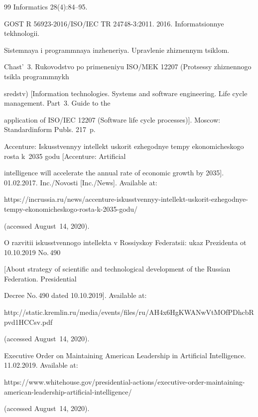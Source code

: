 {{\begin{thebibliography}{99}
{Informatics} 28(4):84--95. 


GOST R 56923-2016/ISO/IEC TR 24748-3:2011. 2016. Informatsionnye tekhnologii. 

Sistemnaya i programmnaya inzheneriya. Upravlenie zhiznennym tsiklom. 

Chast'~3. Rukovodstvo po primeneniyu ISO/MEK 12207 (Protsessy zhiznennogo tsikla programmnykh 

sredstv) [Information technologies. Systems and software engineering. Life cycle management. Part~3. Guide to the 

application of ISO/IEC 12207 (Software life cycle processes)]. Moscow: Standardinform Publs. 217~p. 




Accenture: Iskusstvennyy intellekt uskorit ezhegodnye tempy ekonomicheskogo rosta k~2035 godu [Accenture: Artificial 

intelligence will accelerate the annual rate of economic growth by 2035]. 01.02.2017. Inc.\!/\!Novosti [Inc.\!/\!News]. Available at: {\sf 

https://incrussia.ru/news/accenture-iskusstvennyy-intellekt-uskorit-ezhegodnye-tempy-ekonomicheskogo-rosta-k-2035-godu/} 

(accessed August~14, 2020).


O razvitii iskusstvennogo intellekta v Rossiyskoy Federatsii: ukaz Prezidenta ot 10.10.2019 No.\,490 

[About strategy of scientific and technological development of the Russian Federation. Presidential 

Decree No.\,490 dated 10.10.2019]. Available at: {\sf 

http://static.kremlin.ru/media/events/files/ru/AH4x6HgKWANwVtMOfPDhcbRpv\linebreak d1HCCsv.pdf} 

(accessed August~14, 2020).


Executive Order on Maintaining American Leadership in Artificial Intelligence. 11.02.2019. Available at: {\sf 

https://www.whitehouse.gov/presidential-actions/executive-order-maintaining-american-leadership-artificial-intelligence/} 

(accessed August~14, 2020).



\end{thebibliography}}}
